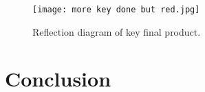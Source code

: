 \documentclass[12pt]{article}
\begin{document}
\begin{figure}[H]
\begin{minipage}{.452\textwidth}
        \vfill
        \texttt{[image: more key done but red.jpg]}
    \end{minipage}
    \caption{\centering Reflection diagram of key final product.}
    \label{fig:13}
\end{figure}

\newpage

\section{Conclusion} \label{sec:4}



\newpage



 \label{sec:ref}

\vspace{1.5cm}

\listoffigures

\listoftables
\end{document}
